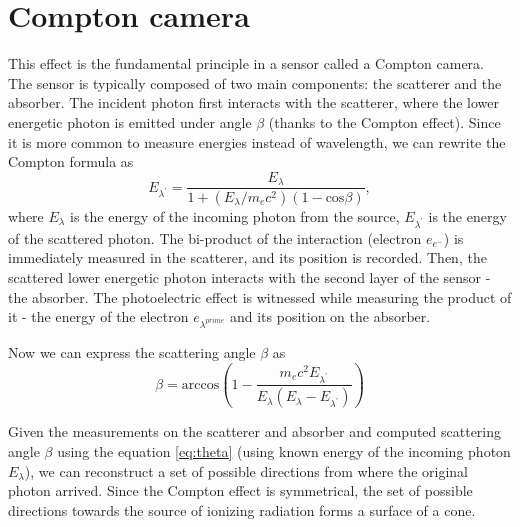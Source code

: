 {  \section{Compton camera}
  This effect is the fundamental principle in a sensor called a Compton camera. 
  The sensor is typically composed of two main components: the scatterer and the absorber. 
  The incident photon first interacts with the scatterer, where the lower energetic photon is emitted under angle $\beta$ (thanks to the Compton effect). 
  Since it is more common to measure energies instead of wavelength, we can rewrite the Compton formula as
  \begin{equation}
  E_{\lambda^{\prime}} = \frac{E_{\lambda}}{  1 + (E_{\lambda} / m_{e}c^{2}) (1 - \mathrm{cos} \beta)},
  \end{equation}
  where $E_{\lambda}$ is the energy of the incoming photon from the source, $E_{\lambda^{\prime}}$ is the energy of the scattered photon.  
  The bi-product of the interaction (electron $e_{e^{-}}$) is immediately measured in the scatterer, and its position is recorded.
  Then, the scattered lower energetic photon interacts with the second layer of the sensor - the absorber. 
  The photoelectric effect is witnessed while measuring the product of it - the energy of the electron $e_{\lambda^{prime}}$ and its position on the absorber.

  Now we can express the scattering angle $\beta$ as
  \begin{equation}
      \beta = \mathrm{arccos} \left (  1-\frac{m_{e}c^{2}E_{\lambda^{\prime}}}{E_{\lambda} (E_{\lambda} - E_{\lambda^{\prime}})} \right )
  \end{equation}

  Given the measurements on the scatterer and absorber and computed scattering angle $\beta$ using the equation \ref{eq:theta} (using known energy of the incoming photon $E_{\lambda}$), we can reconstruct a set of possible directions from where the original photon arrived. Since the Compton effect is symmetrical, the set of possible directions towards the source of ionizing radiation forms a surface of a cone.



}
